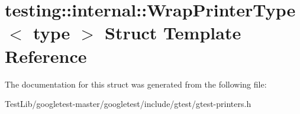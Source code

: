 \hypertarget{structtesting_1_1internal_1_1WrapPrinterType}{}\section{testing\+:\+:internal\+:\+:Wrap\+Printer\+Type$<$ type $>$ Struct Template Reference}
\label{structtesting_1_1internal_1_1WrapPrinterType}


The documentation for this struct was generated from the following file\+:\begin{DoxyCompactItemize}
\item 
Test\+Lib/googletest-\/master/googletest/include/gtest/gtest-\/printers.\+h\end{DoxyCompactItemize}
